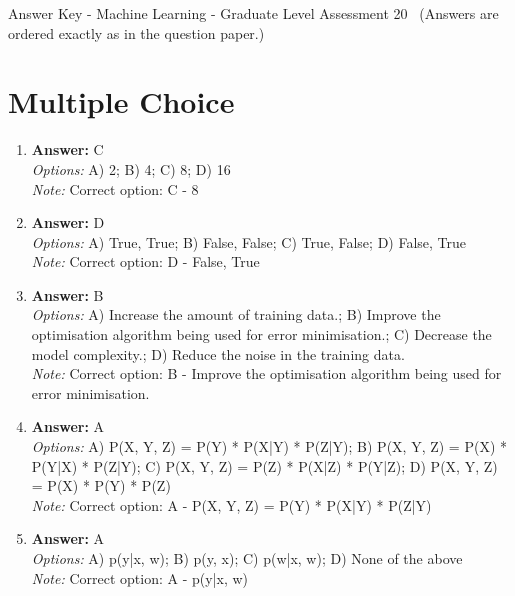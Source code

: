 \documentclass[12pt]{article}
\begin{document}
\begin{center}
Answer Key - Machine Learning - Graduate Level Assessment 20 \
\small (Answers are ordered exactly as in the question paper.)
\end{center}

\section*{Multiple Choice}
\begin{enumerate}[label=\arabic*.]
\item \textbf{Answer:} C
\\ \textit{Options:} A) 2; B) 4; C) 8; D) 16
\\ \textit{Note:} Correct option: C - 8
\item \textbf{Answer:} D
\\ \textit{Options:} A) True, True; B) False, False; C) True, False; D) False, True
\\ \textit{Note:} Correct option: D - False, True
\item \textbf{Answer:} B
\\ \textit{Options:} A) Increase the amount of training data.; B) Improve the optimisation algorithm being used for error minimisation.; C) Decrease the model complexity.; D) Reduce the noise in the training data.
\\ \textit{Note:} Correct option: B - Improve the optimisation algorithm being used for error minimisation.
\item \textbf{Answer:} A
\\ \textit{Options:} A) P(X, Y, Z) = P(Y) * P(X|Y) * P(Z|Y); B) P(X, Y, Z) = P(X) * P(Y|X) * P(Z|Y); C) P(X, Y, Z) = P(Z) * P(X|Z) * P(Y|Z); D) P(X, Y, Z) = P(X) * P(Y) * P(Z)
\\ \textit{Note:} Correct option: A - P(X, Y, Z) = P(Y) * P(X|Y) * P(Z|Y)
\item \textbf{Answer:} A
\\ \textit{Options:} A) p(y|x, w); B) p(y, x); C) p(w|x, w); D) None of the above
\\ \textit{Note:} Correct option: A - p(y|x, w)
\end{enumerate}
\end{document}
